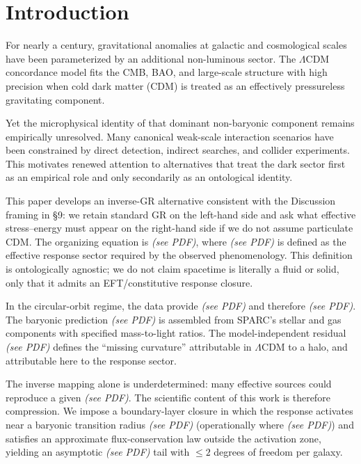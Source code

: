\section{Introduction}


For nearly a century, gravitational anomalies at galactic and cosmological scales have been parameterized by an additional non-luminous sector. The $\Lambda$CDM concordance model fits the CMB, BAO, and large-scale structure with high precision when cold dark matter (CDM) is treated as an effectively pressureless gravitating component.

Yet the microphysical identity of that dominant non-baryonic component remains empirically unresolved. Many canonical weak-scale interaction scenarios have been constrained by direct detection, indirect searches, and collider experiments. This motivates renewed attention to alternatives that treat the dark sector first as an empirical role and only secondarily as an ontological identity.

This paper develops an inverse-GR alternative consistent with the Discussion framing in \S9: we retain standard GR on the left-hand side and ask what effective stress--energy must appear on the right-hand side if we do not assume particulate CDM. The organizing equation is \emph{(see PDF)}, where \emph{(see PDF)} is defined as the effective response sector required by the observed phenomenology. This definition is ontologically agnostic; we do not claim spacetime is literally a fluid or solid, only that it admits an EFT/constitutive response closure.

In the circular-orbit regime, the data provide \emph{(see PDF)} and therefore \emph{(see PDF)}. The baryonic prediction \emph{(see PDF)} is assembled from SPARC's stellar and gas components with specified mass-to-light ratios. The model-independent residual \emph{(see PDF)} defines the ``missing curvature'' attributable in $\Lambda$CDM to a halo, and attributable here to the response sector.

The inverse mapping alone is underdetermined: many effective sources could reproduce a given \emph{(see PDF)}. The scientific content of this work is therefore compression. We impose a boundary-layer closure in which the response activates near a baryonic transition radius \emph{(see PDF)} (operationally where \emph{(see PDF)}) and satisfies an approximate flux-conservation law outside the activation zone, yielding an asymptotic \emph{(see PDF)} tail with $\le 2$ degrees of freedom per galaxy.

